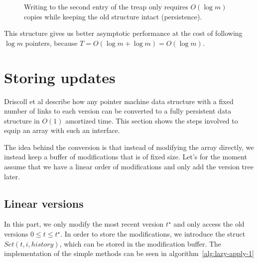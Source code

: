 \documentclass[11pt,a4paper,twoside,openright]{Thesis}
\theoremstyle{definition}
\newcommand{\figlabel}[1]{\label{fig:#1}}
\begin{document}
\begin{figure}
\caption[Treap for history storage]{\figlabel{treap}Writing to the second entry of the treap only requires
$O(\log m)$ copies while keeping the old structure intact (persistence).}
\end{figure}

This structure gives us better asymptotic performance at the cost of
following $\log m$ pointers, because $T = O(\log m + \log m) = O(\log m)$.

\section{Storing updates}
Driscoll et al\cite{Dris89a} describe how any pointer machine data structure
with a fixed number of links to each version can be converted to a fully
persistent data structure in $O(1)$ amortized time. This section shows
the steps involved to equip an array with such an interface.

The idea behind the conversion is that instead of modifying the array
directly, we instead keep a buffer of modifications that is of fixed
size. Let's for the moment assume that we have a linear order of modifications
and only add the version tree later.

\subsection{Linear versions}
In this part, we only modify the most recent version $t^\star$ and only
access the old versions $0 \leq t \leq t^\star$. In order to store the
modifications, we introduce the struct $Set(t, i, history)$, which can be stored
in the modification buffer. The implementation of the simple methods can be
seen in algorithm~\ref{alg:lazy-apply-1}
\end{document}
